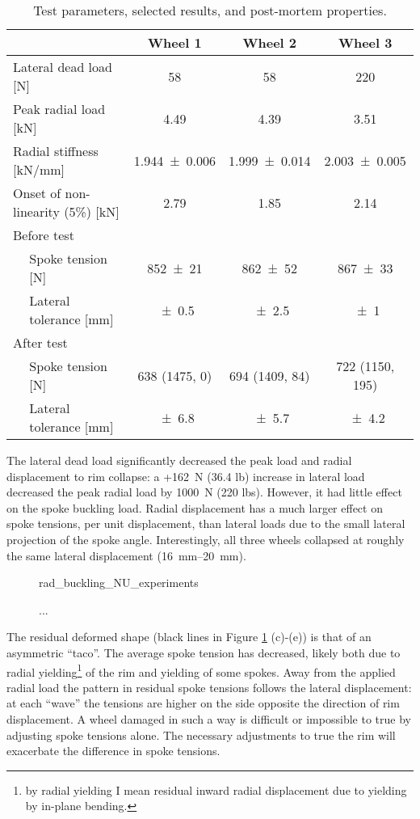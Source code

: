 \documentclass[\rootdir/thesis.tex]{subfiles}
\begin{document}
\begin{table}
\caption{Test parameters, selected results, and post-mortem properties.}
\label{tab:rad_buckling_tests}
\begin{tabular}{llccc}
\hline
&& \bf Wheel 1 & \bf Wheel 2 & \bf Wheel 3\\
\hline
\multicolumn{2}{l}{Lateral dead load [\si{N}]} & \num{58} & \num{58} & \num{220}\\
\multicolumn{2}{l}{Peak radial load [\si{kN}]} & \num{4.49} & \num{4.39} & \num{3.51}\\
\multicolumn{2}{l}{Radial stiffness [\si{kN/mm}]} & \num{1.944+-0.006} & \num{1.999+-0.014} & \num{2.003+-0.005}\\
\multicolumn{2}{l}{Onset of non-linearity (5\%) [\si{kN}]} & \num{2.79} & \num{1.85} & \num{2.14}\\
\multicolumn{5}{l}{Before test}\\
\,& Spoke tension [\si{N}]      & \num{852+-21} & \num{862+-52} & \num{867+-33}\\
\,& Lateral tolerance [\si{mm}] & \num{+-0.5} & \num{+-2.5} & \num{+-1}\\

\multicolumn{5}{l}{After test}\\
\,& Spoke tension [\si{N}]      & 638 (1475, 0) & 694 (1409, 84) & 722 (1150, 195)\\
\,& Lateral tolerance [\si{mm}] & \num{+-6.8} & \num{+-5.7} & \num{+-4.2}\\
\hline
\end{tabular}
\end{table}

The lateral dead load significantly decreased the peak load and radial displacement to rim collapse: a +\SI{162}{N} (\num{36.4} lb) increase in lateral load decreased the peak radial load by \SI{1000}{N} (\num{220} lbs). However, it had little effect on the spoke buckling load. Radial displacement has a much larger effect on spoke tensions, per unit displacement, than lateral loads due to the small lateral projection of the spoke angle. Interestingly, all three wheels collapsed at roughly the same lateral displacement (\SIrange{16}{20}{mm}).

\begin{figure}[h]
\centering
{rad_buckling_NU_experiments}
\caption{...}
\label{fig:rad_buckling_NU_experiments}
\end{figure}

The residual deformed shape (black lines in Figure \ref{fig:rad_buckling_NU_experiments} (c)-(e)) is that of an asymmetric ``taco''. The average spoke tension has decreased, likely both due to radial yielding\footnote{by radial yielding I mean residual inward radial displacement due to yielding by in-plane bending.} of the rim and yielding of some spokes. Away from the applied radial load the pattern in residual spoke tensions follows the lateral displacement: at each ``wave'' the tensions are higher on the side opposite the direction of rim displacement. A wheel damaged in such a way is difficult or impossible to true by adjusting spoke tensions alone. The necessary adjustments to true the rim will exacerbate the difference in spoke tensions.
\end{document}

